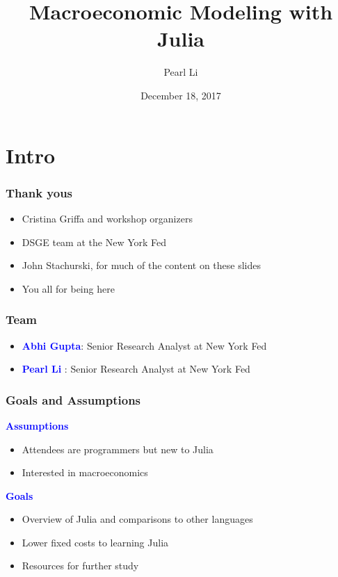 \documentclass[
  xcolor={svgnames},
  hyperref={colorlinks,citecolor=DeepPink4,linkcolor=DarkRed,urlcolor=DarkBlue}
  ]{beamer}  %
\title{Macroeconomic Modeling with Julia}
\author{Pearl Li}
\institute[New York Fed]{Federal Reserve Bank of New York}
\date{December 18, 2017}
\newcommand\boldblue[1]{\textcolor{blue}{\textbf{#1}}}
\begin{document}
\maketitle

\section{Intro}
\begin{frame}
  \frametitle{Thank yous}

  \begin{itemize}
    \setlength\itemsep{1em}
    \item Cristina Griffa and workshop organizers
    \item DSGE team at the New York Fed
    \item John Stachurski, for much of the content on these slides
    \item You all for being here
  \end{itemize}
\end{frame}

\begin{frame}
  \frametitle{Team}

  \begin{itemize}
    \setlength\itemsep{1em}
    \item \boldblue{Abhi Gupta}: Senior Research Analyst at New York Fed
    \item \boldblue{Pearl Li }: Senior Research Analyst at New York Fed
  \end{itemize}
\end{frame}

\begin{frame}
  \frametitle{Goals and Assumptions}

  \vspace{1em}

  \boldblue{Assumptions}
  \begin{itemize}
    \item Attendees are programmers but new to Julia
    \item Interested in macroeconomics
  \end{itemize}

  \vspace{1em}

  \boldblue{Goals}
  \begin{itemize}
    \item Overview of Julia and comparisons to other languages
    \item Lower fixed costs to learning Julia
    \item Resources for further study
  \end{itemize}

\end{frame}
\end{document}
